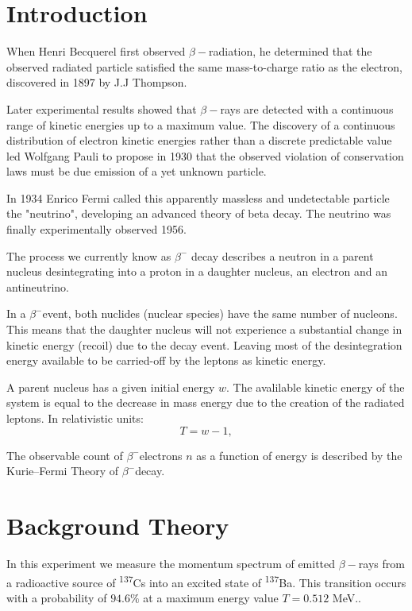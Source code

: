 \documentclass[9pt, a4paper]{article}
\begin{document}
\section{Introduction}
\begin{multicols}{2}
When Henri Becquerel first observed $\beta-$radiation, he determined that the observed radiated particle satisfied the same mass-to-charge ratio as the electron, discovered in 1897 by J.J Thompson\cite{Wikipedia-particle}. 

Later experimental results showed that $\beta-$rays are detected with a continuous range of kinetic energies up to a maximum value\cite{SMM}. 
The discovery of a continuous distribution of electron kinetic energies rather than a discrete predictable value led Wolfgang Pauli to propose in 1930 that the observed violation of conservation laws must be due emission of a yet unknown particle.

In 1934 Enrico Fermi called this apparently massless and undetectable particle the "neutrino", developing an advanced theory of beta decay. The neutrino was finally experimentally observed 1956.\cite{Nave-beta} 

The process we currently know as $\beta^{-}$ decay describes a neutron in a parent nucleus desintegrating into a proton in a daughter nucleus, an electron and an antineutrino.

In a $\beta^{-}$event, both nuclides (nuclear species) have the same number of nucleons. This means that the daughter nucleus will not experience a substantial change in kinetic energy (recoil) due to the decay event. Leaving most of the desintegration energy available to be carried-off by the leptons as kinetic energy. 

A parent nucleus has a given initial energy $w$. 
The avalilable kinetic energy of the system is equal to the decrease in mass energy due to the creation of the radiated leptons. In relativistic units:
\begin{equation}T = w - 1,
\end{equation}

The observable count of $\beta^{-}$electrons $n$ as a function of energy is described by the Kurie--Fermi Theory of $\beta^{-}$decay.

\section{Background Theory}

In this experiment we measure the momentum spectrum of emitted $\beta-$rays from a radioactive source of \textsuperscript{137}Cs into an excited state of \textsuperscript{137}Ba. This transition occurs with a probability of $94.6\%$ at a maximum energy value $T = 0.512$ MeV.\cite{SPA}.


\end{multicols}
\end{document}
